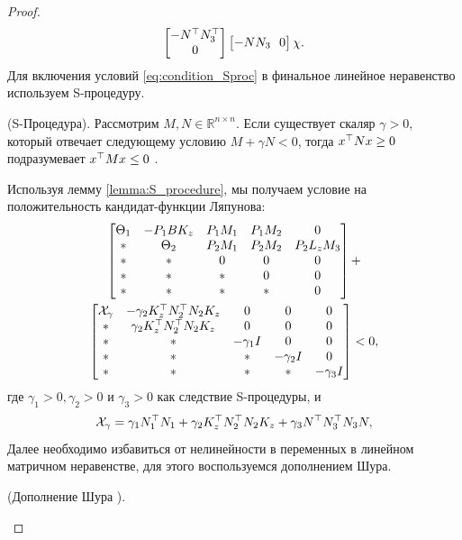 \begin{proof}
\begin{align}
\begin{bmatrix}
			-{N}^\top{N}_3^\top \\ 0  
		\end{bmatrix}\begin{bmatrix}
			-{N}{N}_3 \ \ 0  
		\end{bmatrix} \chi.
	\end{align}
	Для включения условий \ref{eq:condition_Sproc} в финальное линейное неравенство используем S-процедуру.
	\begin{lemma}\label{lemma:S_procedure}
		(S-Процедура).
		Рассмотрим ${M},{N} \in \mathbb{R}^{n\times n}$. Если существует скаляр $\gamma>0$, который отвечает следующему условию ${M}+\gamma {N}<0$, тогда $x^\top {N} x\geq 0$ подразумевает $x^\top{M}x\leq 0$ \cite{BOYED1994}.
	\end{lemma}
	Используя лемму {\ref{lemma:S_procedure}}, мы получаем условие на положительность кандидат-функции Ляпунова:
	\begin{multline}
		\label{eq:after_S}
		\begin{bmatrix}
			{\Theta}_1 & -{P}_1{B}{K}_z & {P}_1{M}_1 & {P}_1{M}_2 &0 \\
			* &    {\Theta}_2 & {P}_2{M}_1 & {P}_2{M}_2 & {P}_2{L}_z{M}_3\\
			* & * & 0 & 0&0\\
			* & * & * & 0&0 \\
			* & * & * & *&0
		\end{bmatrix} + \\
		\begin{bmatrix}
			\mathcal{X}_{\gamma}& -\gamma_2{K}_z^\top{N}_2^\top{N}_2{K}_z &0 &0 & 0\\
			*&\gamma_2{K}_z^\top{N}_2^\top{N}_2{K}_z&0&0&0\\
			*&*&-\gamma_1{I}&0&0\\
			*&*&*&-\gamma_2{I}&0\\
			*&*&*&*&-\gamma_3{I}\\
		\end{bmatrix} 
		<0,
	\end{multline}
	где $\gamma_1 > 0,\gamma_2 > 0$ и $\gamma_3 > 0$ как следствие S-процедуры, и
	\begin{equation}
		\mathcal{X}_{\gamma}=    \gamma_1{N}_1^\top{N}_1 +\gamma_2{K}_z^\top{N}_2^\top{N}_2{K}_z+\gamma_3{N}^\top{N}_3^\top{N}_3{N},
	\end{equation}
	Далее необходимо избавиться от нелинейности в переменных в линейном матричном неравенстве, для этого воспользуемся дополнением Шура.
	\begin{lemma}\label{lemma:Schur}
		(Дополнение Шура \cite{Schur}).

\end{lemma}
\end{proof}
